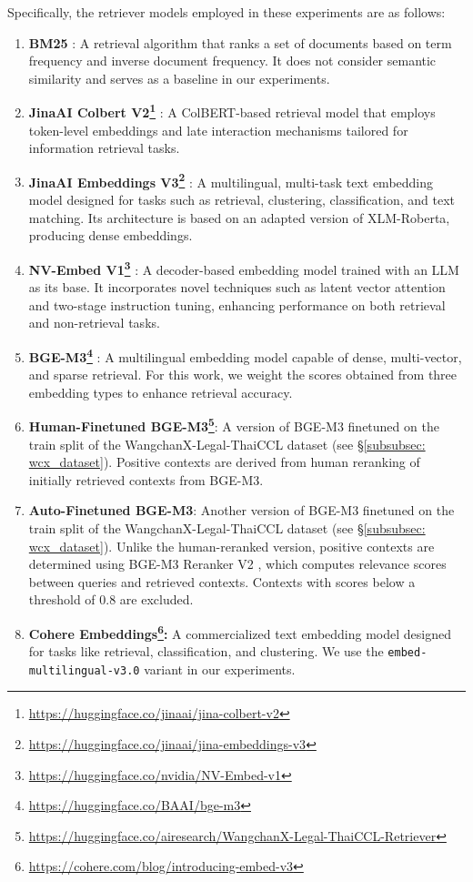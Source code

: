 Specifically, the retriever models employed in these experiments are as follows:
\begin{enumerate}
    \item \textbf{BM25} \cite{bm25}: A retrieval algorithm that ranks a set of documents based on term frequency and inverse document frequency. 
    It does not consider semantic similarity and serves as a baseline in our experiments.
    \item \textbf{JinaAI Colbert V2\footnote{\url{https://huggingface.co/jinaai/jina-colbert-v2}}} \cite{jina-v2}: A ColBERT-based \cite{colbert} retrieval model that employs token-level embeddings and late interaction mechanisms tailored for information retrieval tasks.
    \item \textbf{JinaAI Embeddings V3\footnote{\url{https://huggingface.co/jinaai/jina-embeddings-v3}}} \cite{jina-v3}: A multilingual, multi-task text embedding model designed for tasks such as retrieval, clustering, classification, and text matching. Its architecture is based on an adapted version of XLM-Roberta, producing dense embeddings.
    \item \textbf{NV-Embed V1\footnote{\url{https://huggingface.co/nvidia/NV-Embed-v1}}} \cite{nvembed}: A decoder-based embedding model trained with an LLM as its base. 
    It incorporates novel techniques such as latent vector attention and two-stage instruction tuning, enhancing performance on both retrieval and non-retrieval tasks.
    \item \textbf{BGE-M3\footnote{\url{https://huggingface.co/BAAI/bge-m3}}} \cite{bge-m3}: A multilingual embedding model capable of dense, multi-vector, and sparse retrieval. 
    For this work, we weight the scores obtained from three embedding types to enhance retrieval accuracy.
    \item \textbf{Human-Finetuned BGE-M3\footnote{\url{https://huggingface.co/airesearch/WangchanX-Legal-ThaiCCL-Retriever}}}: A version of BGE-M3 finetuned on the train split of the WangchanX-Legal-ThaiCCL dataset (see \S\ref{subsubsec: wcx_dataset}). 
    Positive contexts are derived from human reranking of initially retrieved contexts from BGE-M3.
    \item \textbf{Auto-Finetuned BGE-M3}: Another version of BGE-M3 finetuned on the train split of the WangchanX-Legal-ThaiCCL dataset (see \S\ref{subsubsec: wcx_dataset}). 
    Unlike the human-reranked version, positive contexts are determined using BGE-M3 Reranker V2 \cite{li2023making}\cite{bge-m3}, which computes relevance scores between queries and retrieved contexts. 
    Contexts with scores below a threshold of 0.8 are excluded.
    \item \textbf{Cohere Embeddings\footnote{\url{https://cohere.com/blog/introducing-embed-v3}}: } A commercialized text embedding model designed for tasks like retrieval, classification, and clustering. 
    We use the \texttt{embed-multilingual-v3.0} variant in our experiments.
\end{enumerate}

